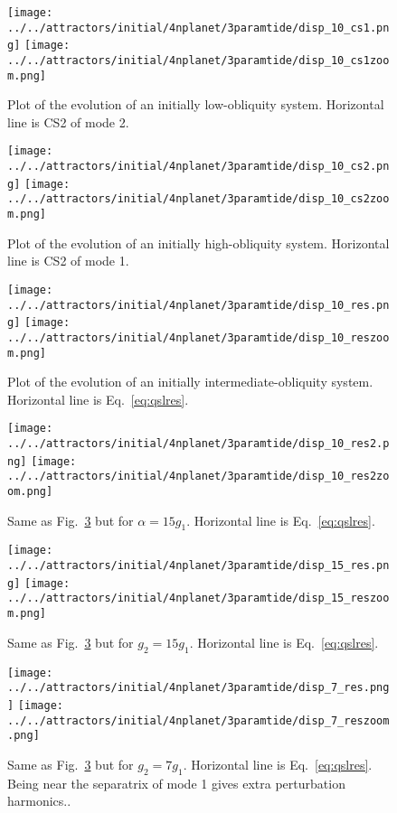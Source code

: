 \documentclass[11pt,
        usenames, %
        dvipsnames %
    ]{article}
\begin{document}
\begin{figure}
    \centering
    \texttt{[image: ../../attractors/initial/4nplanet/3paramtide/disp\_10\_cs1.png]}
    \texttt{[image: ../../attractors/initial/4nplanet/3paramtide/disp\_10\_cs1zoom.png]}
    \caption{Plot of the evolution of an initially low-obliquity
    system. Horizontal line is CS2 of mode 2.}\label{fig:cs1}
\end{figure}
\begin{figure}
    \centering
    \texttt{[image: ../../attractors/initial/4nplanet/3paramtide/disp\_10\_cs2.png]}
    \texttt{[image: ../../attractors/initial/4nplanet/3paramtide/disp\_10\_cs2zoom.png]}
    \caption{Plot of the evolution of an initially high-obliquity
    system. Horizontal line is CS2 of mode 1.}\label{fig:cs2}
\end{figure}
\begin{figure}
    \centering
    \texttt{[image: ../../attractors/initial/4nplanet/3paramtide/disp\_10\_res.png]}
    \texttt{[image: ../../attractors/initial/4nplanet/3paramtide/disp\_10\_reszoom.png]}
    \caption{Plot of the evolution of an initially intermediate-obliquity
    system. Horizontal line is Eq.~\eqref{eq:qslres}.}\label{fig:res}
\end{figure}
\begin{figure}
    \centering
    \texttt{[image: ../../attractors/initial/4nplanet/3paramtide/disp\_10\_res2.png]}
    \texttt{[image: ../../attractors/initial/4nplanet/3paramtide/disp\_10\_res2zoom.png]}
    \caption{Same as Fig.~\ref{fig:res} but for $\alpha =
    15g_1$. Horizontal line is Eq.~\eqref{eq:qslres}.}\label{fig:res2}
\end{figure}
\begin{figure}
    \centering
    \texttt{[image: ../../attractors/initial/4nplanet/3paramtide/disp\_15\_res.png]}
    \texttt{[image: ../../attractors/initial/4nplanet/3paramtide/disp\_15\_reszoom.png]}
    \caption{Same as Fig.~\ref{fig:res} but for $g_2 = 15g_1$. Horizontal line
    is Eq.~\eqref{eq:qslres}.}\label{fig:res3}
\end{figure}
\begin{figure}
    \centering
    \texttt{[image: ../../attractors/initial/4nplanet/3paramtide/disp\_7\_res.png]}
    \texttt{[image: ../../attractors/initial/4nplanet/3paramtide/disp\_7\_reszoom.png]}
    \caption{Same as Fig.~\ref{fig:res} but for $g_2 = 7g_1$. Horizontal line
    is Eq.~\eqref{eq:qslres}. Being near the separatrix of mode 1 gives extra
    perturbation harmonics..}\label{fig:res4}
\end{figure}
\end{document}

